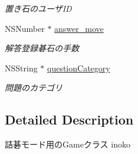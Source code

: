 \begin{DoxyCompactItemize}
\begin{DoxyCompactList}\small\item\em 置き石のユーザID \end{DoxyCompactList}\item 
\hypertarget{interface_tsumego_games_af42640758d6ef9a9cdb894ee0f0262e1}{
NSNumber $\ast$ \hyperlink{interface_tsumego_games_af42640758d6ef9a9cdb894ee0f0262e1}{answer\_\-move}}
\label{interface_tsumego_games_af42640758d6ef9a9cdb894ee0f0262e1}

\begin{DoxyCompactList}\small\item\em 解答登録碁石の手数 \end{DoxyCompactList}\item 
\hypertarget{interface_tsumego_games_afee34c738156cf3d24ad43164b2318d2}{
NSString $\ast$ \hyperlink{interface_tsumego_games_afee34c738156cf3d24ad43164b2318d2}{questionCategory}}
\label{interface_tsumego_games_afee34c738156cf3d24ad43164b2318d2}

\begin{DoxyCompactList}\small\item\em 問題のカテゴリ \end{DoxyCompactList}\end{DoxyCompactItemize}


\subsection{Detailed Description}
詰碁モード用のGameクラス  inoko 

